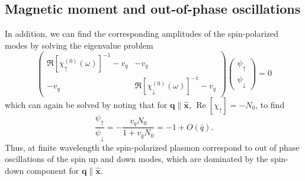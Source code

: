 \documentclass[aps,prb,reprint,twocolumns,superscriptaddress,nofootinbib]{revtex4-2}
\DeclareMathOperator{\Ree}{Re}
\newcommand{\xx}{\hat{\bm{x}}}
\begin{document}
	\subsection{Magnetic moment and out-of-phase oscillations}
	In addition, we can find the corresponding amplitudes of the spin-polarized modes by solving the eigenvalue problem 
	\begin{equation}
		\begin{pmatrix}
			\Re[\chi_{\uparrow}^{(0)}(\omega)]^{-1}-v_q & -v_q \\
			-v_q & \Re[\chi_{\downarrow}^{(0)}(\omega)]^{-1}-v_q
		\end{pmatrix}\begin{pmatrix}
		\psi_\uparrow \\ \psi_\downarrow
		\end{pmatrix} =0
	\end{equation}
	which can again be solved by noting that for $\bm q\parallel\xx$, $\Ree[\chi_\uparrow]=-N_0$, to find
	\begin{equation}
		\frac{\psi_\uparrow}{\psi_\downarrow} = 
		-
			\frac{v_q N_0}{1+v_qN_0} = -1 + O(\bar q).
	\end{equation}
	Thus, at finite wavelength the spin-polarized plasmon correspond to  out of phase oscillations of the spin up and down modes, which are dominated by the spin-down component for $\bm q\parallel \xx$.
	
\end{document}
